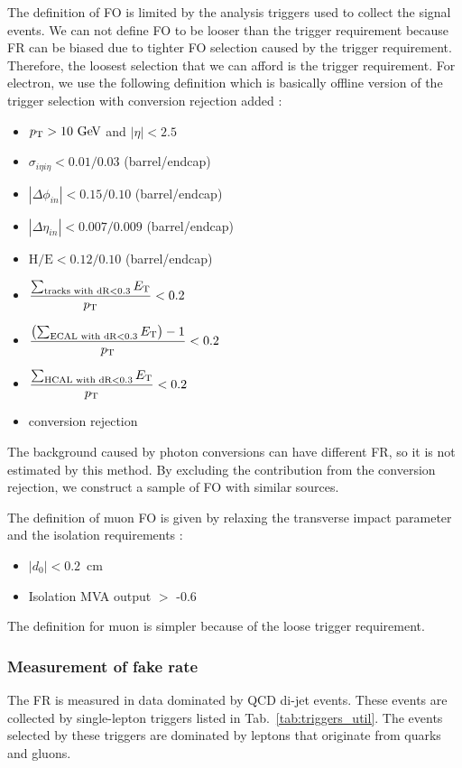 The definition of FO is limited by the analysis triggers used to collect the signal events. 
We can not define FO to be looser than the trigger requirement because FR can be 
biased due to tighter FO selection caused by the trigger requirement. Therefore, the 
loosest selection that we can afford is the trigger requirement. For electron,  
we use the following definition which is basically offline version of the trigger selection
with conversion rejection added : 
\begin{itemize}
  \item $p_\mathrm{T}>10~\mathrm{Ge\kern -0.1em V}$ and $|\eta| < 2.5$
  \item $\sigma_{i\eta i\eta} < 0.01/0.03$ (barrel/endcap)
  \item $|\Delta\phi_{in}| < 0.15/0.10$ (barrel/endcap)
  \item $|\Delta\eta_{in}| < 0.007/0.009$ (barrel/endcap)
  \item $\textrm{H/E}< 0.12/0.10$ (barrel/endcap)
  \item $\displaystyle \frac{\sum_{\textrm{tracks with dR}<0.3}E_\mathrm{T}}{p_\mathrm{T}}<0.2$
  \item $\displaystyle \frac{\left(\sum_{\textrm{ECAL with dR}<0.3}E_\mathrm{T}\right)-1}{p_\mathrm{T}}<0.2$
  \item $\displaystyle \frac{\sum_{\textrm{HCAL with dR}<0.3}E_\mathrm{T}}{p_\mathrm{T}}<0.2$
  \item conversion rejection 
\end{itemize}
The background caused by photon conversions 
can have different FR, so it is not estimated by this method. 
By excluding the contribution from the conversion rejection, 
we construct a sample of FO with similar sources. 

The definition of muon FO is given by relaxing the transverse impact parameter and 
the isolation requirements :  
\begin{itemize}
    \item $\left|d_0\right| < 0.2$~cm
    \item Isolation MVA output $>$ -0.6
\end{itemize}
The definition for muon is simpler because of the loose trigger requirement. 

\subsubsection{Measurement of fake rate}

The FR is measured in data dominated by QCD di-jet events. 
These events are collected by single-lepton triggers listed in Tab.~\ref{tab:triggers_util}.
The events selected by these triggers are dominated by leptons that 
originate from quarks and gluons. 

